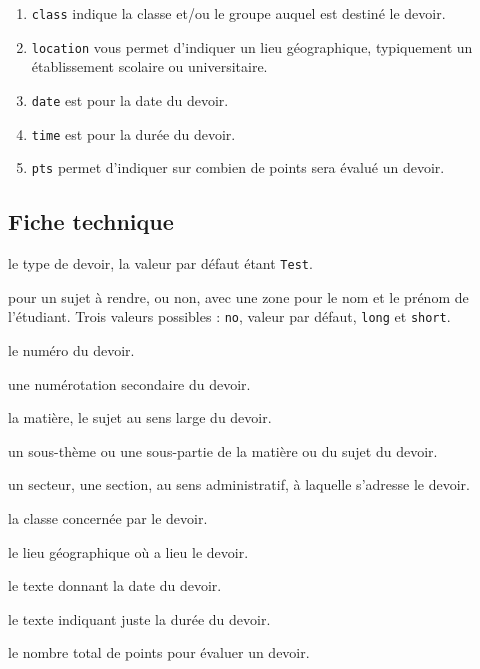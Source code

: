 \documentclass[12pt,a4paper]{scrartcl}
\begin{document}
\begin{enumerate}
    \item \verb+class+ indique la classe et/ou le groupe auquel est destiné le devoir.

    \item \verb+location+ vous permet d'indiquer un lieu géographique, typiquement un établissement scolaire ou universitaire.

    \item \verb+date+ est pour la date du devoir.

    \item \verb+time+ est pour la durée du devoir.

    \item \verb+pts+ permet d'indiquer sur combien de points sera évalué un devoir.
\end{enumerate}


    \subsection{Fiche technique}


 le type de devoir, la valeur par défaut étant \verb+Test+.

 pour un sujet à rendre, ou non, avec une zone pour le nom et le prénom de l'étudiant. Trois valeurs possibles : \verb+no+, valeur par défaut, \verb+long+ et \verb+short+.

 le numéro du devoir.

 une numérotation secondaire du devoir.

 la matière, le sujet au sens large du devoir.

 un sous-thème ou une sous-partie de la matière ou du sujet du devoir.

 un secteur, une section, au sens administratif, à laquelle s'adresse le devoir.

 la classe concernée par le devoir.

 le lieu géographique où a lieu le devoir.

 le texte donnant la date du devoir.

 le texte indiquant juste la durée du devoir.

 le nombre total de points pour évaluer un devoir.
\end{document}
